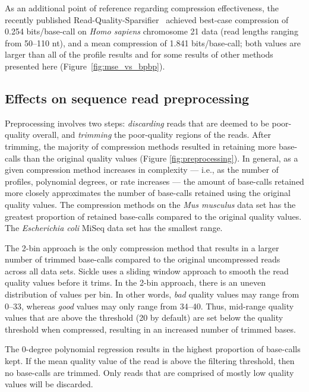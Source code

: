 \documentclass[fleqn,10pt,lineno]{wlpeerj} %
\begin{document}
As an additional point of reference regarding compression
effectiveness, the recently published
Read-Quality-Sparsifier~\citep{DBLP:conf/recomb/YuYB14} achieved
best-case compression of 0.254 bits/base-call on \textit{Homo sapiens}
chromosome 21 data (read lengths ranging from 50--110 nt), and a mean
compression of 1.841 bits/base-call; both values are larger than all
of the profile results and for some results of other methods presented
here (Figure~\ref{fig:mse_vs_bpbp}).

\subsection*{Effects on sequence read preprocessing}

Preprocessing involves two steps: \emph{discarding} reads that are
deemed to be poor-quality overall, and \emph{trimming} the
poor-quality regions of the reads. After trimming, the majority of
compression methods resulted in retaining more base-calls than the
original quality values (Figure \ref{fig:preprocessing}). In general,
as a given compression method increases in complexity --- i.e., as the
number of profiles, polynomial degrees, or rate increases --- the
amount of base-calls retained more closely approximates the number of
base-calls retained using the original quality values. The compression
methods on the \textit{Mus musculus} data set has the greatest
proportion of retained base-calls compared to the original quality
values. The \textit{Escherichia coli} MiSeq data set has the smallest
range.

The 2-bin approach is the only compression method that results in a
larger number of trimmed base-calls compared to the original
uncompressed reads across all data sets. Sickle uses a sliding window
approach to smooth the read quality values before it trims. In the
2-bin approach, there is an uneven distribution of values per bin. In
other words, \emph{bad} quality values may range from 0--33, whereas
\emph{good} values may only range from 34--40. Thus, mid-range quality
values that are above the threshold (20 by default) are set below the
quality threshold when compressed, resulting in an increased number of
trimmed bases.

The 0-degree polynomial regression results in the highest proportion
of base-calls kept. If the mean quality value of the read is above the
filtering threshold, then no base-calls are trimmed. Only reads that
are comprised of mostly low quality values will be discarded.
\end{document}
